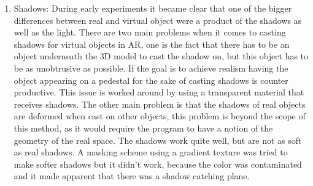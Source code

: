 \begin{enumerate}
 \item Shadows: During early experiments it became clear that one of the bigger differences between real and virtual object were a product of the shadows as well as the light. There are two main problems when it comes to casting shadows for virtual objects in AR, one is the fact that there has to be an object underneath the 3D model to cast the shadow on, but this object has to be as unobtrusive as possible. If the goal is to achieve realism having the object appearing on a pedestal for the sake of casting shadows is counter productive. This issue is worked around by using a transparent material that receives shadows. The other main problem is that the shadows of real objects are deformed when cast on other objects, this problem is beyond the scope of this method, as it would require the program to have a notion of the geometry of the real space.\newline
 The shadows work quite well, but are not as soft as real shadows. A masking scheme using a gradient texture was tried to make softer shadows but it didn't work, because the color was contaminated and it made apparent that there was a shadow catching plane. 
 
\end{enumerate}